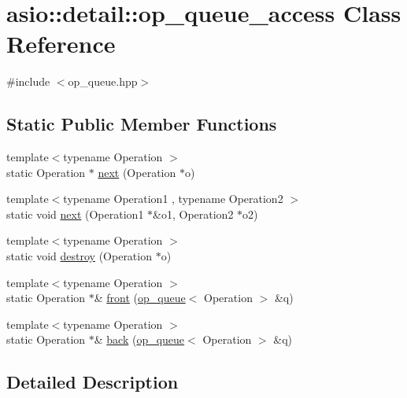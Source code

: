 \hypertarget{classasio_1_1detail_1_1op__queue__access}{}\section{asio\+:\+:detail\+:\+:op\+\_\+queue\+\_\+access Class Reference}
\label{classasio_1_1detail_1_1op__queue__access}


{\ttfamily \#include $<$op\+\_\+queue.\+hpp$>$}

\subsection*{Static Public Member Functions}
\begin{DoxyCompactItemize}
\item 
{\footnotesize template$<$typename Operation $>$ }\\static Operation $\ast$ \hyperlink{classasio_1_1detail_1_1op__queue__access_a073517c9ad7ea32a352ec76a94067aab}{next} (Operation $\ast$o)
\item 
{\footnotesize template$<$typename Operation1 , typename Operation2 $>$ }\\static void \hyperlink{classasio_1_1detail_1_1op__queue__access_a33de1ddb378ceac80ac7120ed2dfd366}{next} (Operation1 $\ast$\&o1, Operation2 $\ast$o2)
\item 
{\footnotesize template$<$typename Operation $>$ }\\static void \hyperlink{classasio_1_1detail_1_1op__queue__access_a143d05ac8d1a98877d6b2bd6e4ea6b55}{destroy} (Operation $\ast$o)
\item 
{\footnotesize template$<$typename Operation $>$ }\\static Operation $\ast$\& \hyperlink{classasio_1_1detail_1_1op__queue__access_a2b10b3da4e10d5ebfc0c497e947462e3}{front} (\hyperlink{classasio_1_1detail_1_1op__queue}{op\+\_\+queue}$<$ Operation $>$ \&q)
\item 
{\footnotesize template$<$typename Operation $>$ }\\static Operation $\ast$\& \hyperlink{classasio_1_1detail_1_1op__queue__access_a1ae0e7d05d583aaba50d6fbf24278707}{back} (\hyperlink{classasio_1_1detail_1_1op__queue}{op\+\_\+queue}$<$ Operation $>$ \&q)
\end{DoxyCompactItemize}


\subsection{Detailed Description}


